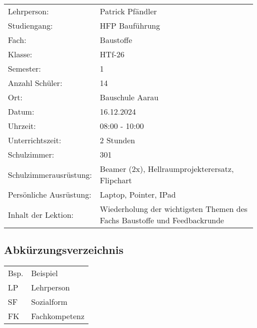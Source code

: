 \documentclass[
11pt,
captions=tableheading,
headsepline,
footsepline, 
captions=tableheading,
parskip=half-,
]{scrartcl}
\begin{document}
\begin{table}[ht]
    \centering
    \label{tab:uebersicht}
    \begin{tabularx}{\textwidth}{@{}Xp{11cm}@{}}
    \toprule
    Lehrperson: & Patrick Pfändler \\
    Studiengang: & HFP Bauführung \\
    Fach: & Baustoffe \\
    \midrule
    Klasse: & HTf-26 \\
    Semester: & 1 \\
    Anzahl Schüler: & 14 \\
    Ort: & Bauschule Aarau \\
    Datum: & 16.12.2024 \\
    Uhrzeit: & 08:00 - 10:00 \\
    Unterrichtszeit: & 2 Stunden \\
    Schulzimmer: & 301 \\
    Schulzimmerausrüstung: & Beamer (2x), Hellraumprojekterersatz, Flipchart \\
    \midrule
    Persönliche Ausrüstung: & Laptop, Pointer, IPad \\
    \midrule
    Inhalt der Lektion: & Wiederholung der wichtigsten Themen des Fachs Baustoffe und Feedbackrunde \\
    \bottomrule
    \end{tabularx}
    \end{table}



\clearpage
\vspace*{2cm}
\setcounter{tocdepth}{3} %
\tableofcontents%
\clearpage

\subsection*{Abkürzungsverzeichnis}
\begin{table}[H]
    \centering
    \label{tab:abkuerzungen}
    \begin{tabularx}{\textwidth}{@{}ll@{}}
    \toprule
    Bsp. & Beispiel \\
    LP & Lehrperson \\
    SF & Sozialform \\
    FK & Fachkompetenz \\
    \bottomrule
    \end{tabularx}
    \end{table}
\end{document}
